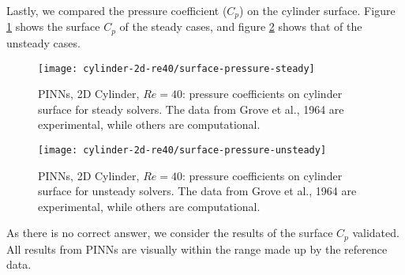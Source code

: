 Lastly, we compared the pressure coefficient ($C_p$) on the cylinder surface.
Figure \ref{fig:cylinder-2d-re40-surface-cp-steady} shows the surface $C_p$ of the steady cases, and figure \ref{fig:cylinder-2d-re40-surface-cp-unsteady} shows that of the unsteady cases.
\begin{figure}[hbt!]
    \texttt{[image: cylinder-2d-re40/surface-pressure-steady]}
    \caption[%
        PINNs, 2D Cylinder, $Re=40$: pressure coefficients on cylinder surface for steady solvers%
    ]{
        PINNs, 2D Cylinder, $Re=40$: pressure coefficients on cylinder surface for steady solvers. %
        The data from Grove et al., 1964 are experimental, while others are computational.%
    }%
    \label{fig:cylinder-2d-re40-surface-cp-steady}
\end{figure}
\begin{figure}[hbt!]
    \texttt{[image: cylinder-2d-re40/surface-pressure-unsteady]}
    \caption[%
        PINNs, 2D Cylinder, $Re=40$: pressure coefficients on cylinder surface for unsteady solvers%
    ]{
        PINNs, 2D Cylinder, $Re=40$: pressure coefficients on cylinder surface for unsteady solvers. %
        The data from Grove et al., 1964 are experimental, while others are computational.
    }%
    \label{fig:cylinder-2d-re40-surface-cp-unsteady}
\end{figure}
As there is no correct answer, we consider the results of the surface $C_p$ validated.
All results from PINNs are visually within the range made up by the reference data.
